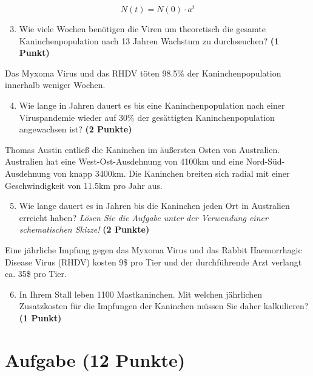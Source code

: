 \documentclass[a4paper, 9pt]{scrartcl}\usepackage[]{graphicx}\usepackage[]{xcolor}
\begin{document}
\begin{equation*}
  N(t) = N(0) \cdot a^t
\end{equation*}

\begin{enumerate}
  \setcounter{enumi}{2}
\item Wie viele Wochen benötigen die Viren um theoretisch die gesamte Kaninchenpopulation nach 13 Jahren Wachstum zu durchseuchen? \textbf{(1 Punkt)}
\end{enumerate}

Das Myxoma Virus und das RHDV töten 98.5\% der Kaninchenpopulation innerhalb weniger Wochen.

\begin{enumerate}
  \setcounter{enumi}{3}  
\item Wie lange in Jahren dauert es bis eine Kaninchenpopulation nach einer Viruspandemie wieder auf 30\% der gesättigten Kaninchenpopulation angewachsen ist?  \textbf{(2 Punkte)}
\end{enumerate}

Thomas Austin entließ die Kaninchen im äußersten Osten von Australien. Australien hat eine West-Ost-Ausdehnung von 4100km und eine Nord-Süd-Ausdehnung von knapp 3400km. Die Kaninchen breiten sich radial mit einer Geschwindigkeit von 11.5km pro Jahr aus.

\begin{enumerate}
  \setcounter{enumi}{4}
\item Wie lange dauert es in Jahren bis die Kaninchen jeden Ort in Australien erreicht haben? \textit{Lösen Sie die Aufgabe unter der Verwendung einer schematischen Skizze!} \textbf{(2 Punkte)}
\end{enumerate}

Eine jährliche Impfung gegen das Myxoma Virus und das Rabbit Haemorrhagic Disease Virus (RHDV) kosten 9\$ pro Tier und der durchführende Arzt verlangt ca. 35\$ pro Tier.

\begin{enumerate}
  \setcounter{enumi}{5}
\item In Ihrem Stall leben 1100 Mastkaninchen. Mit welchen jährlichen Zusatzkosten für die Impfungen der Kaninchen müssen Sie daher kalkulieren? \textbf{(1 Punkt)}
\end{enumerate}
 
\clearpage

\section{Aufgabe \hfill (12 Punkte)}
\end{document}
